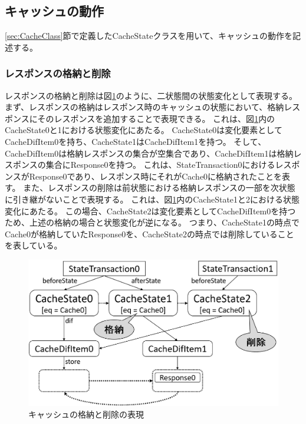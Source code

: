 \documentclass[12pt,a4paper]{jbook}
\begin{document}
\color{red}
\subsection{キャッシュの動作}
\ref{sec:CacheClass}節で定義したCacheStateクラスを用いて、キャッシュの動作を記述する。

\subsubsection{レスポンスの格納と削除}
レスポンスの格納と削除は図\ref{fig:ProposedModel-ResponseStoreDelete}のように、二状態間の状態変化として表現する。
まず、レスポンスの格納はレスポンス時のキャッシュの状態において、格納レスポンスにそのレスポンスを追加することで表現できる。
これは、図\ref{fig:ProposedModel-ResponseStoreDelete}内のCacheState0と1における状態変化にあたる。
CacheState0は変化要素としてCacheDifItem0を持ち、CacheState1はCacheDifItem1を持つ。
そして、CacheDifItem0は格納レスポンスの集合が空集合であり、CacheDifItem1は格納レスポンスの集合にResponse0を持つ。
これは、StateTransaction0におけるレスポンスがResponse0であり、レスポンス時にそれがCache0に格納されたことを表す。
また、レスポンスの削除は前状態における格納レスポンスの一部を次状態に引き継がないことで表現する。
これは、図\ref{fig:ProposedModel-ResponseStoreDelete}内のCacheState1と2における状態変化にあたる。
この場合、CacheState2は変化要素としてCacheDifItem0を持つため、上述の格納の場合と状態変化が逆になる。
つまり、CacheState1の時点でCache0が格納していたResponse0を、CacheState2の時点では削除していることを表している。

\begin{figure}[htb]
\centering
\includegraphics[width=450pt]{./fig/ProposedModel-ResponseStoreDelete.eps}
\caption{キャッシュの格納と削除の表現}
\label{fig:ProposedModel-ResponseStoreDelete}
\end{figure}
\end{document}
